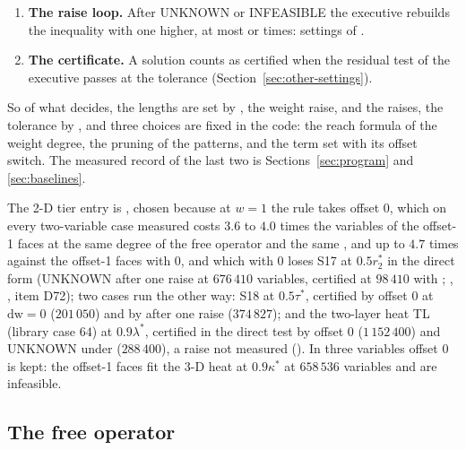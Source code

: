 \begin{enumerate}
\item \textbf{The raise loop.} After UNKNOWN or INFEASIBLE the executive rebuilds the inequality with  one higher, at most  or  times: settings of .
\item \textbf{The certificate.} A solution counts as certified when the residual test of the executive passes at the tolerance  (Section~\ref{sec:other-settings}).
\end{enumerate}
So of what  decides, the lengths are set by , the weight raise,  and the raises, the tolerance by , and three choices are fixed in the code: the reach formula of the weight degree, the pruning of the patterns, and the term set with its offset switch. The measured record of the last two is Sections~\ref{sec:program} and \ref{sec:baselines}.

The 2-D tier entry is , chosen because at $w=1$ the rule takes offset $0$, which on every two-variable case measured costs $3.6$ to $4.0$ times the variables of the offset-1 faces at the same degree of the free operator and the same , and up to $4.7$ times against the offset-1 faces with  $0$, and which with  $0$ loses S17 at $0.5r_2^*$ in the direct form (UNKNOWN after one raise at $676\,410$ variables, certified at $98\,410$ with ; , , item D72); two cases run the other way: S18 at $0.5\tau^*$, certified by offset $0$ at $\mathrm{dw}=0$ ($201\,050$) and by  after one raise ($374\,827$); and the two-layer heat TL (library case $64$) at $0.9\lambda^*$, certified in the direct test by offset $0$ ($1\,152\,400$) and UNKNOWN under  ($288\,400$), a raise not measured (\gapsref). In three variables offset $0$ is kept: the offset-1 faces fit the 3-D heat at $0.9\kappa^*$ at $658\,536$ variables and are infeasible.

\subsection{The free operator}\label{sec:var-settings}


